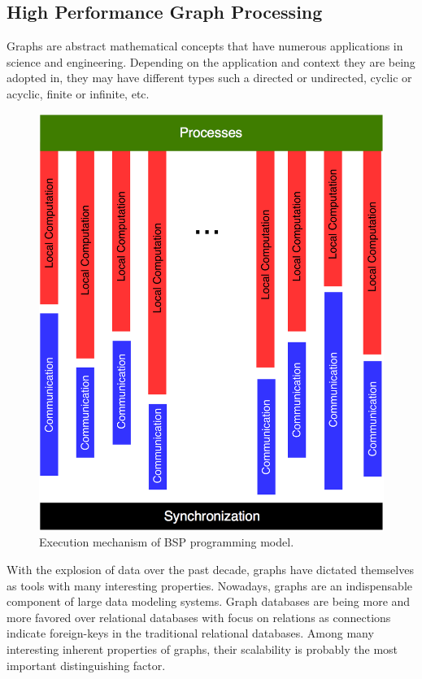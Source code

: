 \documentclass[runningheads,a4paper]{llncs}
\begin{document}
{\subsection{High Performance Graph Processing}
Graphs are abstract mathematical concepts that have numerous applications in science and engineering. Depending on the application and context they are being adopted in, they may have different types such a directed or undirected, cyclic or acyclic, finite or infinite, etc.\\
\begin{figure}[!ht]
	\includegraphics[scale=0.25]{./images/graph_multi.png}
	\centering
	\caption{Execution mechanism of BSP programming model.}
	\label{fig:BSP}
\end{figure}
With the explosion of data over the past decade, graphs have dictated themselves as tools with many interesting properties. Nowadays, graphs are an indispensable component of large data modeling systems. Graph databases are being more and more favored over relational databases with focus on relations as connections indicate foreign-keys in the traditional relational databases. Among many interesting inherent properties of graphs, their scalability is probably the most important distinguishing factor.\\

}
\end{document}
